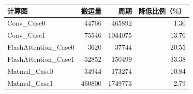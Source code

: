 \begin{tabular}{lrrr}\toprule 计算图 & 搬运量 & 周期 & 降低比例（\%）\\\midrule
Conv\_Case0 & 44766 & 465892 & 1.30 \\
Conv\_Case1 & 75546 & 1044075 & 13.76 \\
FlashAttention\_Case0 & 3620 & 37744 & 20.55 \\
FlashAttention\_Case1 & 32852 & 150499 & 33.38 \\
Matmul\_Case0 & 34944 & 173274 & 10.84 \\
Matmul\_Case1 & 460800 & 1749773 & 2.79 \\
\bottomrule\end{tabular}
